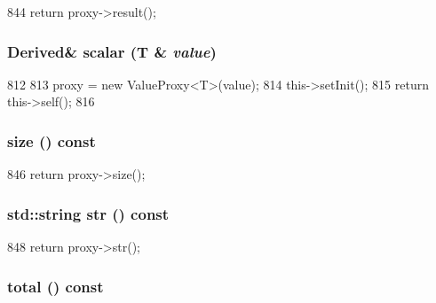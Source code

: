 \begin{DoxyCode}
844 { return proxy->result(); }
\end{DoxyCode}
\hypertarget{classStats_1_1ValueBase_a0273fd64504789a214a7057649605612}{
\subsubsection[{scalar}]{\setlength{\rightskip}{0pt plus 5cm}Derived\& scalar (T \& {\em value})}}
\label{classStats_1_1ValueBase_a0273fd64504789a214a7057649605612}



\begin{DoxyCode}
812     {
813         proxy = new ValueProxy<T>(value);
814         this->setInit();
815         return this->self();
816     }
\end{DoxyCode}
\hypertarget{classStats_1_1ValueBase_a503ab01f6c0142145d3434f6924714e7}{
\subsubsection[{size}]{ size () const}}
\label{classStats_1_1ValueBase_a503ab01f6c0142145d3434f6924714e7}



\begin{DoxyCode}
846 { return proxy->size(); }
\end{DoxyCode}
\hypertarget{classStats_1_1ValueBase_a1b9b8885b0880fc4ddf9a2c7d1ca3dc4}{
\subsubsection[{str}]{\setlength{\rightskip}{0pt plus 5cm}std::string str () const}}
\label{classStats_1_1ValueBase_a1b9b8885b0880fc4ddf9a2c7d1ca3dc4}



\begin{DoxyCode}
848 { return proxy->str(); }
\end{DoxyCode}
\hypertarget{classStats_1_1ValueBase_a35c6e2ed3fc81b40d69052a062113ead}{
\subsubsection[{total}]{ total () const}}
\label{classStats_1_1ValueBase_a35c6e2ed3fc81b40d69052a062113ead}



